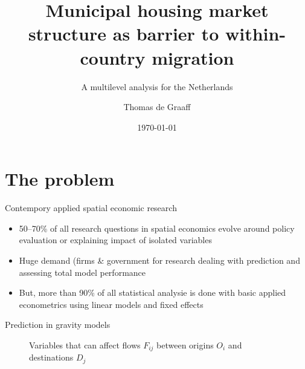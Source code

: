 \documentclass{beamer}
\title{Municipal housing market structure as barrier to within-country migration}
\subtitle{A multilevel analysis for the Netherlands}
\date{\today}
\author{Thomas de Graaff}
\institute{Vrije Universiteit Amsterdam\\Department of Spatial Economics}
\begin{document}
\maketitle

\section{The problem}

  \begin{frame}{Contempory applied spatial economic research}
    	\begin{itemize}
    		\item 50--70\% of all research questions in spatial economics evolve around policy \alert{evaluation} or \alert{explaining} impact of \alert{isolated} variables 
    		\item Huge demand (firms \& government for research dealing with \alert{prediction} and \alert{assessing} total model performance
    		\item But, more than 90\% of all statistical analysie is done with basic applied econometrics using \alert{linear} models and \alert{fixed} effects
    	\end{itemize}
  \end{frame}

\begin{frame}{Prediction in gravity models}
	 \begin{figure}	

		\caption{Variables that can affect flows $F_{ij}$ between origins $O_i$ and destinations $D_j$}
	\end{figure}
\end{frame}
\end{document}
